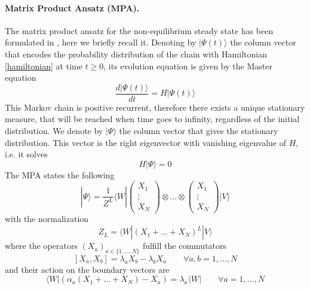 \documentclass[11pt]{article}
\numberwithin{equation}{section}
\numberwithin{equation}{subsection}
\begin{document}
\paragraph{Matrix Product Ansatz (MPA).} The matrix product ansatz for the non-equilibrium steady state has been formulated in \cite{vanicat2017exact}, here we briefly recall it.
 Denoting by $|\Psi(t)\rangle$ the column vector that encodes the probability distribution of the chain with Hamiltonian \eqref{hamiltonian} at time $t\geq 0$, its evolution equation is given by 
 the Master equation
\begin{equation}
    \frac{d|{\Psi}(t)\rangle}{dt}=H|{\Psi}(t)\rangle
\end{equation}
This Markov chain is positive recurrent, therefore there exists a unique stationary measure, that will be reached when time goes to infinity, regardless of the initial distribution. 
We denote by $|\Psi\rangle$ the column vector that gives the stationary distribution. This vector is the right eigenvector with vanishing eigenvalue of $H$, i.e. it solves 
\begin{equation}
	H|\Psi\rangle =0
\end{equation}
The MPA states the following
\begin{equation}
	|\Psi\rangle=\frac{1}{Z^{L}}\langle W|\begin{pmatrix}
		X_{1}\\
		\vdots\\
		X_{N}
	\end{pmatrix}\otimes \ldots\otimes \begin{pmatrix}
		X_{1}\\
		\vdots\\
		X_{N}
	\end{pmatrix}|V\rangle
\end{equation}
with the normalization 
\begin{equation}
	Z_{L}=\langle W|(X_{1}+\ldots +X_{N})^{L}|V\rangle
\end{equation}
where the operators $(X_{a})_{a\in \{1,\ldots,N\}}$ fulfill the commutators
\begin{equation}\label{bulk}
	\left[X_{a},X_{b}\right]=\lambda_{a}X_{b}-\lambda_{b}X_{a}\qquad\forall a,b=1,\ldots,N
\end{equation}
and their action on the boundary vectors are
\begin{equation}\label{leftBoundary}
	\langle W|\left(\alpha_{a}(X_{1}+\ldots+X_{N})-X_{a}\right)=\lambda_{a}\langle W|\qquad\forall a=1,\ldots,N
\end{equation}
\end{document}
